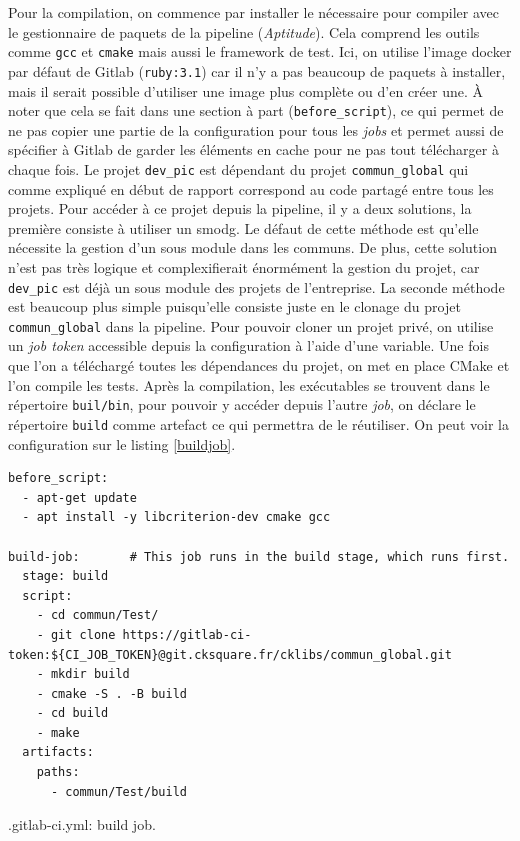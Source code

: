 \documentclass[a4paper]{article}
\begin{document}
Pour la compilation, on commence par installer le nécessaire pour compiler avec
le gestionnaire de paquets de la pipeline (\textit{Aptitude}). Cela comprend les
outils comme \verb|gcc| et \verb|cmake| mais aussi le framework de test. Ici, on
utilise l'image docker par défaut de Gitlab (\verb|ruby:3.1|) car il n'y a pas
beaucoup de paquets à installer, mais il serait possible d'utiliser une image
plus complète ou d'en créer une. À noter que cela se fait dans une section à
part (\verb|before_script|), ce qui permet de ne pas copier une partie de la
configuration pour tous les \textit{jobs} et permet aussi de spécifier à Gitlab
de garder les éléments en cache pour ne pas tout télécharger à chaque fois. Le
projet \verb|dev_pic| est dépendant du projet \verb|commun_global| qui comme
expliqué en début de rapport correspond au code partagé entre tous les projets.
Pour accéder à ce projet depuis la pipeline, il y a deux solutions, la première
consiste à utiliser un \gls{smodg}. Le défaut de cette méthode est qu'elle
nécessite la gestion d'un sous module dans les communs. De plus, cette solution
n'est pas très logique et complexifierait énormément la gestion du projet, car
\verb|dev_pic| est déjà un sous module des projets de l'entreprise. La seconde
méthode est beaucoup plus simple puisqu'elle consiste juste en le clonage du
projet \verb|commun_global| dans la pipeline. Pour pouvoir cloner un projet
privé, on utilise un \textit{job token} accessible depuis la configuration à
l'aide d'une variable. Une fois que l'on a téléchargé toutes les dépendances du
projet, on met en place CMake et l'on compile les tests. Après la compilation, les
exécutables se trouvent dans le répertoire \verb|buil/bin|, pour pouvoir y
accéder depuis l'autre \textit{job}, on déclare le répertoire \verb|build| comme
artefact ce qui permettra de le réutiliser. On peut voir la configuration sur le
listing \ref{buildjob}.

\begin{listing}[ht!]
\begin{verbatim}
before_script:
  - apt-get update
  - apt install -y libcriterion-dev cmake gcc

build-job:       # This job runs in the build stage, which runs first.
  stage: build
  script:
    - cd commun/Test/
    - git clone https://gitlab-ci-token:${CI_JOB_TOKEN}@git.cksquare.fr/cklibs/commun_global.git
    - mkdir build
    - cmake -S . -B build
    - cd build
    - make
  artifacts:
    paths:
      - commun/Test/build
\end{verbatim}
\caption{.gitlab-ci.yml: build job.}
\label{buildjob}
\end{listing}
\end{document}
